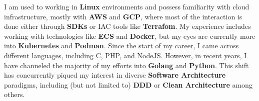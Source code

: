 

%
\begin{cventries}

  \cventry
  {}
  {}
  {}
  {}
  { I am used to working in \textbf{Linux} environments and possess familiarity with cloud infrastructure, mostly with \textbf{AWS} and \textbf{GCP}, where most of the interaction is done either through \textbf{SDKs} or IAC tools like \textbf{Terrafom}. My experience includes working with technologies like \textbf{ECS} and \textbf{Docker}, but my eyes are currently more into \textbf{Kubernetes} and \textbf{Podman}. Since the start of my career, I came across different languages, including C, PHP, and NodeJS. However, in recent years, I have channeled the majority of my efforts into \textbf{Golang} and \textbf{Python}. This shift has concurrently piqued my interest in diverse \textbf{Software Architecture} paradigms, including (but not limited to) \textbf{DDD} or \textbf{Clean Architecture} among others. }
\end{cventries}
